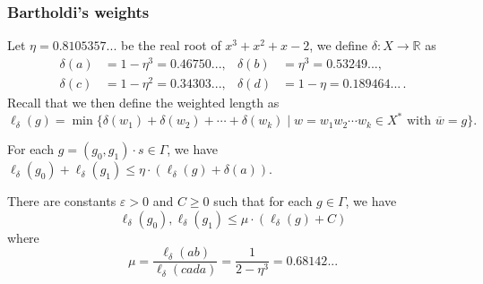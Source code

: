 \documentclass[aspectratio=169,10pt]{beamer}
\renewcommand{\leq}{\leqslant}
\renewcommand{\geq}{\geqslant}
\renewcommand{\emph}[1]{\textit{\bfseries{\color{OwlYellow}#1}}}
\newcommand\Grig{{\Gamma}}
\begin{document}

\begin{frame}
	\frametitle{Bartholdi's weights}

	Let \emph{$\eta=0.8105357...$} be the real root of $x^3+x^2+x-2$, we define $\delta \colon X \to \mathbb R$ as
	\[
		\begin{aligned}
			\delta(a) & = 1-\eta^3 = 0.46750...,    &
			\delta(b) & = \eta^3   = 0.53249...,
			\\
			\delta(c) & = 1-\eta^2 = 0.34303...,    &
			\delta(d) & = 1-\eta   = 0.189464...\,.
		\end{aligned}
	\]
	Recall that we then define the weighted length as
	\[
		\ell_\delta(g)
		=
		\min\{
		\delta(w_1)+\delta(w_2)+\cdots+ \delta(w_k)
		\mid
		w=w_1 w_2 \cdots w_k\in X^*
		\text{ with }
		\overline{w}=g
		\}.
	\]

	\begin{lemma}
		For each $g=(g_0,g_1)\cdot s\in \Grig$, we have
		\emph{$
				\ell_\delta(g_0) + \ell_\delta(g_1)
				\leq
				\eta\cdot
				(
				\ell_\delta(g)
				+\delta(a)
				)
			$}.
	\end{lemma}

	\pause
	\begin{lemma}
		There are constants $\varepsilon>0$ and $C\geq 0$ such that for each $g\in \Grig$, we have
		\emph{\[
				\ell_\delta(g_0), \ell_\delta(g_1)
				\leq
				\mu\cdot(\ell_\delta(g)+C)
			\]}
		where
		\emph{\[
				\mu =
				\frac{\ell_\delta(ab)}{\ell_\delta(cada)}
				=
				\frac{1}{2-\eta^3}
				=
				0.68142...
			\]}
	\end{lemma}

\end{frame}


\end{document}
